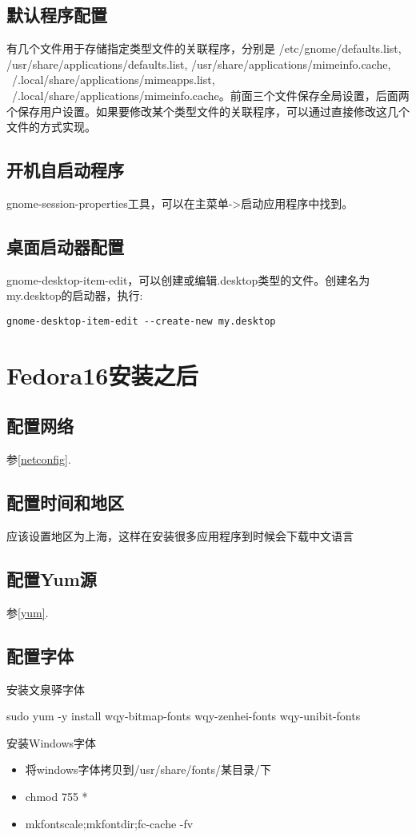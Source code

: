 \subsection{默认程序配置}
有几个文件用于存储指定类型文件的关联程序，分别是 /etc/gnome/defaults.list, /usr/share/applications/defaults.list, /usr/share/applications/mimeinfo.cache, ~/.local/share/applications/mimeapps.list, ~/.local/share/applications/mimeinfo.cache。前面三个文件保存全局设置，后面两个保存用户设置。如果要修改某个类型文件的关联程序，可以通过直接修改这几个文件的方式实现。

\subsection{开机自启动程序}
gnome-session-properties工具，可以在主菜单->启动应用程序中找到。

\subsection{桌面启动器配置}
gnome-desktop-item-edit，可以创建或编辑.desktop类型的文件。创建名为my.desktop的启动器，执行:
\begin{verbatim}
gnome-desktop-item-edit --create-new my.desktop
\end{verbatim}










\section{Fedora16安装之后}

\subsection{配置网络}
参\ref{netconfig}.

\subsection{配置时间和地区}
应该设置地区为上海，这样在安装很多应用程序到时候会下载中文语言

\subsection{配置Yum源}
参\ref{yum}.

\subsection{配置字体}
安装文泉驿字体
\begin{shellcmd}
sudo yum -y install wqy-bitmap-fonts wqy-zenhei-fonts wqy-unibit-fonts
\end{shellcmd}
安装Windows字体
\begin{itemize}
\item 将windows字体拷贝到/usr/share/fonts/某目录/下
\item chmod 755 *
\item mkfontscale;mkfontdir;fc-cache -fv
\end{itemize}

